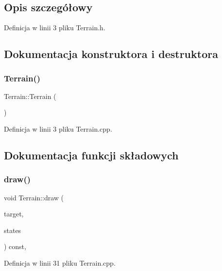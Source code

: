 \subsection{Opis szczegółowy}


Definicja w linii 3 pliku Terrain.\+h.



\subsection{Dokumentacja konstruktora i destruktora}
\mbox{\label{class_terrain_a7160a06ab07a86ed97d23374405e8ef6}} 
\subsubsection{\texorpdfstring{Terrain()}{Terrain()}}
{\footnotesize\ttfamily Terrain\+::\+Terrain (\begin{DoxyParamCaption}{ }\end{DoxyParamCaption})}



Definicja w linii 3 pliku Terrain.\+cpp.



\subsection{Dokumentacja funkcji składowych}
\mbox{\label{class_terrain_a78fb38a85917a89fa9deb9eec9599b49}} 
\subsubsection{\texorpdfstring{draw()}{draw()}}
{\footnotesize\ttfamily void Terrain\+::draw (\begin{DoxyParamCaption}\item[{sf\+::\+Render\+Target \&}]{target,  }\item[{sf\+::\+Render\+States}]{states }\end{DoxyParamCaption}) const\hspace{0.3cm}{\ttfamily [override]}, {\ttfamily [protected]}}



Definicja w linii 31 pliku Terrain.\+cpp.

